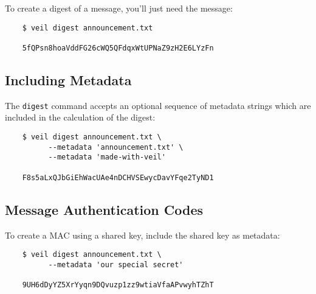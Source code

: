 \documentclass{scrartcl}
\begin{document}
To create a digest of a message, you'll just need the message:

\begin{verbatim}
    $ veil digest announcement.txt

    5fQPsn8hoaVddFG26cWQ5QFdqxWtUPNaZ9zH2E6LYzFn
    \end{verbatim}

\subsection{Including Metadata}\label{subsec:including-metadata}

The \texttt{digest} command accepts an optional sequence of metadata strings which are included in
the calculation of the digest:

\begin{verbatim}
    $ veil digest announcement.txt \
          --metadata 'announcement.txt' \
          --metadata 'made-with-veil'

    F8s5aLxQJbGiEhWacUAe4nDCHVSEwycDavYFqe2TyND1
    \end{verbatim}

\subsection{Message Authentication Codes}\label{subsec:message-authentication-codes}

To create a MAC using a shared key, include the shared key as metadata:

\begin{verbatim}
    $ veil digest announcement.txt \
          --metadata 'our special secret'

    9UH6dDyYZ5XrYyqn9DQvuzp1zz9wtiaVfaAPvwyhTZhT
    \end{verbatim}
\end{document}

